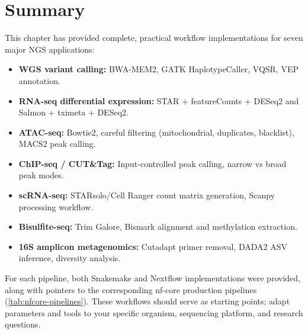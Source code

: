 \section{Summary}
\label{sec:wf:summary}

This chapter has provided complete, practical workflow implementations for seven major NGS applications:

\begin{itemize}[itemsep=2pt]
  \item \textbf{WGS variant calling:} BWA-MEM2, GATK HaplotypeCaller, VQSR, VEP annotation.
  \item \textbf{RNA-seq differential expression:} STAR + featureCounts + DESeq2 and Salmon + tximeta + DESeq2.
  \item \textbf{ATAC-seq:} Bowtie2, careful filtering (mitochondrial, duplicates, blacklist), MACS2 peak calling.
  \item \textbf{ChIP-seq / CUT\&Tag:} Input-controlled peak calling, narrow vs broad peak modes.
  \item \textbf{scRNA-seq:} STARsolo/Cell Ranger count matrix generation, Scanpy processing workflow.
  \item \textbf{Bisulfite-seq:} Trim Galore, Bismark alignment and methylation extraction.
  \item \textbf{16S amplicon metagenomics:} Cutadapt primer removal, DADA2 ASV inference, diversity analysis.
\end{itemize}

For each pipeline, both Snakemake and Nextflow implementations were provided, along with pointers to the corresponding nf-core production pipelines (\cref{tab:nfcore-pipelines}). These workflows should serve as starting points; adapt parameters and tools to your specific organism, sequencing platform, and research questions.
